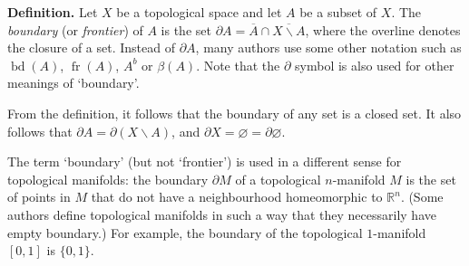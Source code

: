 \documentclass[12pt]{article}
\def\R{\mathbb{R}}
\DeclareMathOperator{\bd}{bd}
\DeclareMathOperator{\fr}{fr}
\begin{document}

{\bf Definition.}
Let $X$ be a topological space and let $A$ be a subset 
of $X$. The \emph{boundary} (or \emph{frontier}) of $A$ is the set
$\partial A = \overline{A}\cap \overline{X\backslash A}$,
where the overline denotes the closure of a set.
Instead of $\partial A$, many authors use some other notation
such as $\bd(A)$, $\fr(A)$, $A^b$ or $\beta(A)$.
Note that the $\partial$ symbol is also used for other meanings of `boundary'.

From the definition, it follows that the boundary of any set is a closed set.
It also follows that $\partial A = \partial(X\backslash A)$,
and $\partial X=\varnothing=\partial\varnothing$.

The term `boundary' (but not `frontier') is used in a different sense for topological manifolds: the boundary $\partial M$ of a topological $n$-manifold $M$ is the set of points in $M$ that do not have a neighbourhood homeomorphic to $\R^n$. (Some authors define topological manifolds in such a way that they necessarily have empty boundary.)
For example, the boundary of the topological $1$-manifold $[0,1]$ is $\{0,1\}$.
\end{document}
